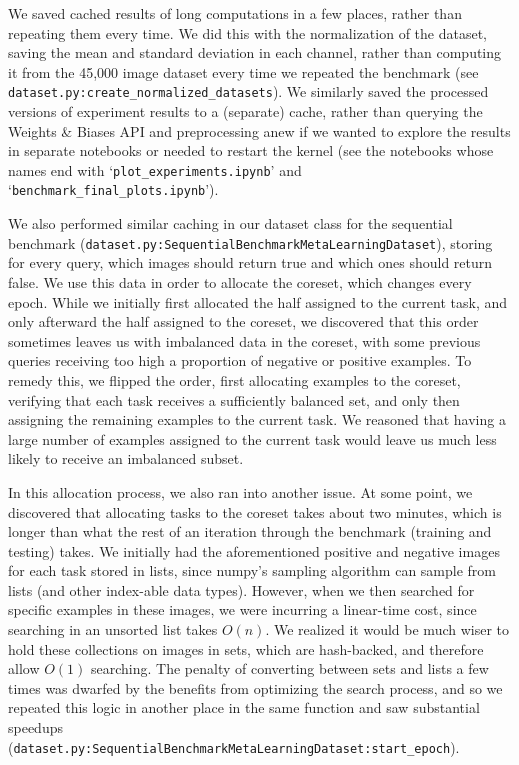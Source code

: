 We saved cached results of long computations in a few places, rather than repeating them every time. We did this with the normalization of the dataset, saving the mean and standard deviation in each channel, rather than computing it from the 45,000 image dataset every time we repeated the benchmark (see \texttt{dataset.py:create\_normalized\_datasets}). We similarly saved the processed versions of experiment results to a (separate) cache, rather than querying the Weights \& Biases API and preprocessing anew if we wanted to explore the results in separate notebooks or needed to restart the kernel (see the notebooks whose names end with `\texttt{plot\_experiments.ipynb}' and `\texttt{benchmark\_final\_plots.ipynb}').

We also performed similar caching in our dataset class for the sequential benchmark (\texttt{dataset.py:SequentialBenchmarkMetaLearningDataset}), storing for every query, which images should return true and which ones should return false. We use this data in order to allocate the coreset, which changes every epoch. While we initially first allocated the half assigned to the current task, and only afterward the half assigned to the coreset, we discovered that this order sometimes leaves us with imbalanced data in the coreset, with some previous queries receiving too high a proportion of negative or positive examples. To remedy this, we flipped the order, first allocating examples to the coreset, verifying that each task receives a sufficiently balanced set, and only then assigning the remaining examples to the current task. We reasoned that having a large number of examples assigned to the current task would leave us much less likely to receive an imbalanced subset. 

In this allocation process, we also ran into another issue. At some point, we discovered that allocating tasks to the coreset takes about two minutes, which is longer than what the rest of an iteration through the benchmark (training and testing) takes. We initially had the aforementioned positive and negative images for each task stored in lists, since numpy’s sampling algorithm can sample from lists (and other index-able data types). However, when we then searched for specific examples in these images, we were incurring a linear-time cost, since searching in an unsorted list takes $O(n)$. We realized it would be much wiser to hold these collections on images in sets, which are hash-backed, and therefore allow $O(1)$ searching. The penalty of converting between sets and lists a few times was dwarfed by the benefits from optimizing the search process, and so we repeated this logic in another place in the same function and saw substantial speedups (\texttt{dataset.py:SequentialBenchmarkMetaLearningDataset:start\_epoch}). 

